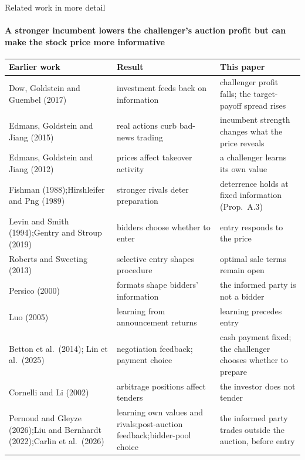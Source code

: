 \documentclass[10pt,aspectratio=169]{beamer}
\newcommand{\NavGap}{\par\vspace{0.45cm}}%
\let\AdapterBackButton\BackButton
\renewcommand{\BackButton}[1]{\NavGap\AdapterBackButton{#1}}%
\begin{document}
\begin{frame}[label=A3]{Related work in more detail}
\framesubtitle{A stronger incumbent lowers the challenger's auction profit but can make the stock price more informative}
\hypertarget{app:lit}{}
\vspace{3pt}
{\scriptsize
\setlength{\tabcolsep}{3pt}
\renewcommand{\arraystretch}{1.0}
\begin{tabular}{@{}>{\raggedright\arraybackslash}p{5.1cm}>{\raggedright\arraybackslash}p{4.8cm}>{\raggedright\arraybackslash}p{4.7cm}@{}}
\toprule
Earlier work & Result & This paper\\
\midrule
Dow, Goldstein and Guembel (2017) & investment feeds back on information & challenger profit falls; the target-payoff spread rises\\\addlinespace[1pt]
Edmans, Goldstein and Jiang (2015) & real actions curb bad-news trading & incumbent strength changes what the price reveals\\\addlinespace[1pt]
Edmans, Goldstein and Jiang (2012) & prices affect takeover activity & a challenger learns its own value\\\addlinespace[1pt]
Fishman (1988);\newline Hirshleifer and Png (1989) & stronger rivals deter preparation & deterrence holds at fixed information (Prop.~A.3)\\\addlinespace[1pt]
Levin and Smith (1994);\newline Gentry and Stroup (2019) & bidders choose whether to enter & entry responds to the price\\\addlinespace[1pt]
Roberts and Sweeting (2013) & selective entry shapes procedure & optimal sale terms remain open\\\addlinespace[1pt]
Persico (2000) & formats shape bidders' information & the informed party is not a bidder\\\addlinespace[1pt]
Luo (2005) & learning from announcement returns & learning precedes entry\\\addlinespace[1pt]
Betton et al.\ (2014); Lin et al.\ (2025) & negotiation feedback; payment choice & cash payment fixed; the challenger chooses whether to prepare\\\addlinespace[1pt]
Cornelli and Li (2002) & arbitrage positions affect tenders & the investor does not tender\\\addlinespace[1pt]
Pernoud and Gleyze (2026);\newline Liu and Bernhardt (2022);\newline Carlin et al.\ (2026) & learning own values and rivals;\newline post-auction feedback;\newline bidder-pool choice & the informed party trades outside the auction, before entry\\
\bottomrule
\end{tabular}\par}
\end{frame}
\end{document}
